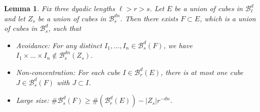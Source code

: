 \documentclass[usenames,dvipsnames,letterpaper, reqno,11pt]{article}
\theoremstyle{plain}
\newtheorem{lemma}{Lemma}
\theoremstyle{plain}
\begin{document}
\begin{lemma}\label{discreteScaleLem}
	Fix three dyadic lengths $\ell > r > s$. Let $E$ be a union of cubes in $\mathcal{B}^d_\ell$ and let $Z_s$ be a union of cubes in $\mathcal{B}^{dn}_s$. Then there exists $F \subset E$, which is a union of cubes in $\mathcal{B}^d_s$, such that
	\begin{itemize}
		\item[(A)] \emph{Avoidance}:  For any distinct $I_1, \dots, I_n \in \mathcal{B}^d_s(F)$, we have $I_1 \times \dots \times I_n \not \in \mathcal{B}^{dn}_s(Z_s)$.
		\item[(B)] \emph{Non-concentration}: For each cube $I \in \mathcal{B}^d_r(E)$, there is at most one cube $J\in \mathcal{B}^d_s(F)$ with $J\subset I$. 
		\item[(C)] \emph{Large size}: $\# \mathcal{B}^d_s(F) \geq \# (\mathcal{B}^d_r(E)) - |Z_s| r^{-dn}$.
	\end{itemize}
\end{lemma}
\end{document}
